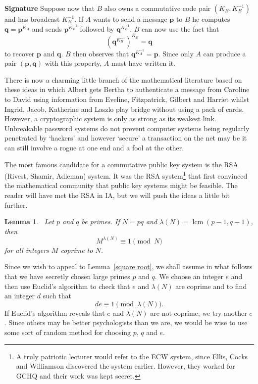 \documentclass[12pt,a4paper]{article}
\theoremstyle{plain}
\newtheorem{lemma}[theorem]{Lemma}
\theoremstyle{definition}
\newcommand{\lcm}{\operatorname{lcm}}
\begin{document}
\vspace{1\baselineskip}

\noindent
{\bf Signature} Suppose now that $B$ also
owns a commutative
code pair $(K_{B},K_{B}^{-1})$ and has broadcast
$K_{B}^{-1}$. If $A$ wants to send a message
${\mathbf p}$ to $B$ he computes
${\mathbf q}={\mathbf p}^{K_{A}}$ and
sends ${\mathbf p}^{K_{B}^{-1}}$
followed by ${\mathbf q}^{K_{B}^{-1}}$.
$B$ can now use the fact that
\[({\mathbf q}^{K_{B}^{-1}})^{K_{B}}=\mathbf{q}\]
to recover ${\mathbf p}$ and ${\mathbf q}$.
$B$ then observes that ${\mathbf q}^{K_{A}^{-1}}={\mathbf p}$.
Since only $A$ can produce a pair $({\mathbf p},{\mathbf q})$
with this property, $A$ must have written it.

\vspace{1\baselineskip}

There is now a charming little branch of the mathematical
literature based on these ideas
in which Albert gets Bertha to authenticate
a message from  Caroline to David using information
from Eveline, Fitzpatrick, Gilbert and Harriet whilst
Ingrid, Jacob, Katherine and Laszlo play bridge without
using a pack of cards. However, a cryptographic
system is only as strong as its weakest link.
Unbreakable password systems do not prevent
computer systems being regularly penetrated by
`hackers' and however `secure' a transaction
on the net may be it can still involve a rogue at
one end and a fool at the other.

The most famous candidate for a commutative
public key system  is the RSA (Rivest, Shamir, Adleman)
system. It was the RSA system\footnote{A truly
patriotic lecturer would refer to the ECW system,
since Ellis, Cocks and Williamson discovered
the system earlier. However, they worked for GCHQ
and their work was kept secret.}
that first convinced the
mathematical community that public key systems
might be feasible. The reader will have met
the RSA in IA, but
we will push the ideas a little bit further.


\begin{lemma}~\label{lambda}
Let $p$ and $q$ be primes. If $N=pq$
and $\lambda(N)=\lcm(p-1,q-1)$, then
\[M^{\lambda(N)}\equiv 1\pmod{N}\]
for all integers $M$ coprime to $N$.
\end{lemma}

Since we wish to appeal to Lemma~\ref{square root},
we shall assume in what follows that
we have secretly chosen large primes $p$ and $q$.
We choose
an integer $e$ and then use Euclid's algorithm
to check that $e$ and $\lambda(N)$ are coprime
and to find an integer $d$ such that
\[de\equiv 1\pmod{\lambda(N)}.\]
If Euclid's algorithm reveals that
$e$ and $\lambda(N)$ are not coprime, we try another $e$.
Since others may be better psychologists than we are,
we would be wise to use some sort of random method
for choosing $p$, $q$ and $e$.
\end{document}
